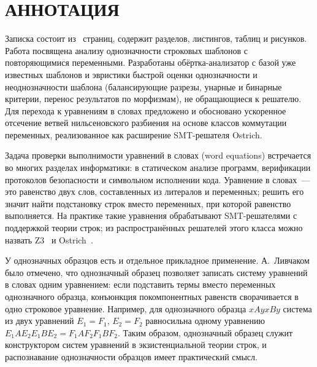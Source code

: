 \documentclass[14pt, russian]{scrartcl}
\begin{document}
\setlength{\tabcolsep}{3pt}
\newpage
\setcounter{page}{2}

\section*{АННОТАЦИЯ}

Записка состоит из~\pageref{TotPages} страниц, содержит \totalsections{} разделов,
\totallistings{} листингов, \totaltables{} таблиц и \totalfigures{} рисунков.
Работа посвящена анализу однозначности строковых шаблонов с повторяющимися
переменными. Разработаны обёртка-анализатор с базой уже известных шаблонов и
эвристики быстрой оценки однозначности и неоднозначности шаблона (балансирующие
разрезы, унарные и бинарные критерии, перенос результатов по морфизмам), не
обращающиеся к решателю. Для перехода к уравнениям в словах предложено и обосновано
ускоренное отсечение ветвей нильсеновского разбиения на основе классов коммутации
переменных, реализованное как расширение SMT-решателя Ostrich.

\newpage
\renewcommand\contentsname{\hfill{\normalfont{СОДЕРЖАНИЕ}}\hfill}
\tableofcontents
\newpage


Задача проверки выполнимости уравнений в словах (word equations) встречается
во многих разделах информатики: в статическом анализе программ, верификации
протоколов безопасности и символьном исполнении кода. Уравнение в словах~---
это равенство двух слов, составленных из литералов и переменных; решить его
значит найти подстановку строк вместо переменных, при которой равенство
выполняется. На практике такие уравнения обрабатывают SMT-решателями с
поддержкой теории строк; из распространённых решателей этого класса можно
назвать Z3~\cite{demoura2008} и Ostrich~\cite{chen2022}.

У однозначных образцов есть и отдельное прикладное применение.
А.~Ливчаком было отмечено, что однозначный образец позволяет записать систему
уравнений в словах одним уравнением: если подставить термы вместо переменных
однозначного образца, конъюнкция покомпонентных равенств сворачивается в одно
строковое уравнение. Например, для однозначного образца $xAyxBy$ система из двух
уравнений $E_1 = F_1$, $E_2 = F_2$ равносильна одному уравнению
$E_1 A E_2 E_1 B E_2 = F_1 A F_2 F_1 B F_2$. Таким образом, однозначный образец
служит конструктором систем уравнений в экзистенциальной теории строк, и
распознавание однозначности образцов имеет практический смысл.
\end{document}
